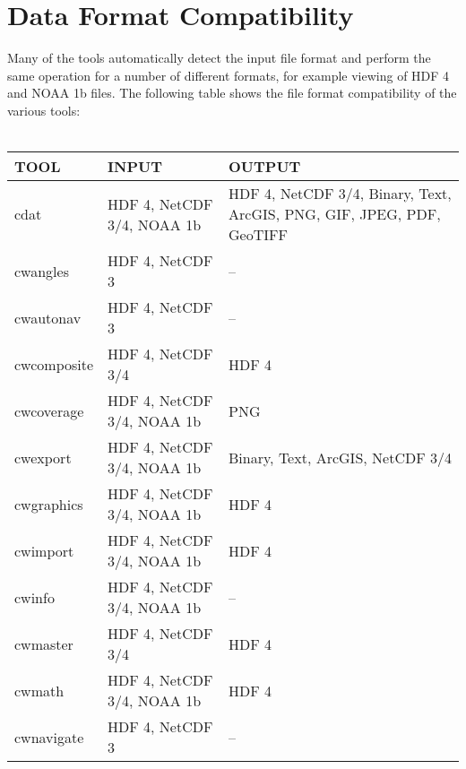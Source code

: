 \chapter{Data Format Compatibility}
\label{compatible}

Many of the tools automatically detect the input file format and
perform the same operation for a number of different formats, for
example viewing of HDF 4 and NOAA 1b files. The following table shows
the file format compatibility of the various tools: \\
\\
\begin{tabular}{|l|p{5cm}|p{5cm}|}
  \hline 

  TOOL & INPUT & OUTPUT \\ \hline

  cdat & HDF 4, NetCDF 3/4, NOAA 1b & HDF 4, NetCDF 3/4,
  Binary, Text, ArcGIS, PNG, GIF, JPEG, PDF, GeoTIFF \\ \hline

  cwangles & HDF 4, NetCDF 3 & -- \\ \hline

  cwautonav & HDF 4, NetCDF 3 & -- \\ \hline

  cwcomposite & HDF 4, NetCDF 3/4 & HDF 4 \\ \hline

  cwcoverage & HDF 4, NetCDF 3/4, NOAA 1b & PNG \\ \hline


  cwexport & HDF 4, NetCDF 3/4, NOAA 1b & Binary, Text, ArcGIS,
  NetCDF 3/4 \\ \hline

  cwgraphics & HDF 4, NetCDF 3/4, NOAA 1b & HDF 4 \\ \hline

  cwimport & HDF 4, NetCDF 3/4, NOAA 1b & HDF 4 \\ \hline

  cwinfo & HDF 4, NetCDF 3/4, NOAA 1b & -- \\ \hline

  cwmaster & HDF 4, NetCDF 3/4 & HDF 4 \\ \hline

  cwmath & HDF 4, NetCDF 3/4, NOAA 1b & HDF 4 \\ \hline

  cwnavigate & HDF 4, NetCDF 3 & -- \\ \hline


\end{tabular}
